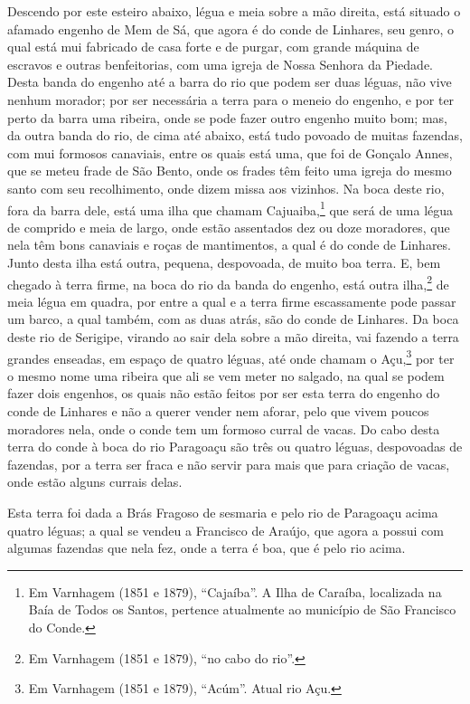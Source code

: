 Descendo por este esteiro abaixo, légua e meia sobre a mão direita, está situado o afamado
engenho de Mem de Sá, que agora é do conde de Linhares, seu genro, o qual está mui
fabricado de casa forte e de purgar, com grande máquina de escravos e outras benfeitorias,
com uma igreja de Nossa Senhora da Piedade. Desta banda do engenho até a barra do rio que
podem ser duas léguas, não vive nenhum morador; por ser necessária a terra para o meneio
do engenho, e por ter perto da barra uma ribeira, onde se pode fazer outro engenho muito
bom; mas, da outra banda do rio, de cima até abaixo, está tudo povoado de muitas fazendas,
com mui formosos canaviais, entre os quais está uma, que foi
de Gonçalo Annes, que se meteu frade de São Bento, onde
os frades têm feito uma igreja do mesmo santo com seu recolhimento, onde dizem missa aos
vizinhos. Na boca deste rio, fora da barra dele, está uma ilha que chamam
Cajuaiba,\footnote{ Em Varnhagem (1851 e 1879), ``Cajaíba''. A Ilha de Caraíba, localizada
na Baía de Todos os Santos, pertence atualmente ao município de São Francisco do Conde.}
que será de uma légua de comprido e meia de largo, onde estão assentados dez ou doze
moradores, que nela têm bons canaviais e roças de mantimentos, a qual é do conde de
Linhares. Junto desta ilha está outra, pequena, despovoada, de muito boa terra. E, bem
chegado à terra firme, na boca do rio da banda do engenho, está outra ilha,\footnote{ Em
Varnhagem (1851 e 1879), ``no cabo do rio''.} de meia légua em quadra, por entre a qual e
a terra firme escassamente pode passar um barco, a qual também, com as duas atrás, são do
conde de Linhares. Da boca deste rio de Serigipe, virando ao sair dela sobre a mão
direita, vai fazendo a terra grandes enseadas, em espaço de quatro léguas, até onde chamam
o Açu,\footnote{ Em Varnhagem (1851 e 1879), ``Acúm''. Atual rio Açu.} por ter o mesmo
nome uma ribeira que ali se vem meter no salgado, na qual se podem fazer dois engenhos, os
quais não estão feitos por ser esta terra do engenho do conde de Linhares e não a querer
vender nem aforar, pelo que vivem poucos moradores nela, onde o
conde tem um formoso curral de vacas. Do cabo desta terra do conde à boca do rio Paragoaçu
são três ou quatro léguas, despovoadas de fazendas, por a terra ser fraca e não servir
para mais que para criação de vacas, onde estão alguns currais delas.

Esta terra foi dada a Brás Fragoso de sesmaria e pelo rio de Paragoaçu acima quatro
léguas; a qual se vendeu a Francisco de Araújo, que agora a possui com algumas fazendas
que nela fez, onde a terra é boa, que é pelo rio acima.

